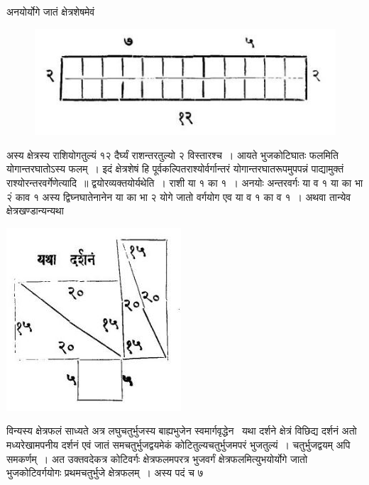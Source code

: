 \documentclass[11pt, openany]{book}
\begin{document}
\noindent अनयोर्योगे जातं क्षेत्रशेषमेवं 

\begin{figure}[h!]
    \centering
    \includegraphics[scale=0.65]{Graphics/Capture7.JPG}
\end{figure}
\vspace{-2mm}

\noindent अस्य क्षेत्रस्य राशियोगतुल्यं १२ दैर्घ्यं राशन्तरतुल्यो २ विस्तारश्च~। 
आयते भुजकोटिघातः फलमिति योगान्तरघातोऽस्य फलम्~। इदं क्षेत्रशेषं हि पूर्वकल्पितराश्योर्वर्गान्तरं योगान्तरघातरूपमुपपन्नं पाद्यामुक्तं 
राश्योरन्तरवर्गेणेत्यादि~॥ द्वयोरव्यक्तयोर्यथेति~। राशी या १ का १~। 
अनयोः अन्तरवर्गः या व १ या का भा २ं काव १ अस्य 
द्विघ्नघातेनानेन या का भा २ योगे जातो वर्गयोग एव या व १ 
का व १~। अथवा तान्येव क्षेत्रखण्डान्यन्यथा 
\vspace{-3mm}

\begin{flushright}
\begin{minipage}[c]{0.3\textwidth}
\includegraphics[scale=0.7]{Graphics/Capture8.JPG}
\end{minipage} 
\hfill
\begin{minipage}{0.55\textwidth} 
\noindent विन्यस्य क्षेत्रफलं साध्यते अत्र लघुचतुर्भुजस्य बाह्यभुजेन \;स्वमार्गवृद्धेन ~यथा \;दर्शने \;क्षेत्रं \;विछिद्य दर्शनं अतो मध्यरेखामपनीय दर्शनं एवं जातं समचतुर्भुजद्वयमेकं कोटितुल्यचतुर्भुजमपरं भुजतुल्यं~। चतुर्भुजद्वयम् अपि समकर्णम्~। अत उक्तवदेकत्र कोटिवर्गः क्षेत्रफलमपरत्र भुजवर्गं क्षेत्रफलमित्युभयोर्योगे जातो भुजकोटिवर्गयोगः प्रथमचतुर्भुजे क्षेत्रफलम्~। अस्य पदं च ७
\end{minipage} 
\end{flushright}
\end{document}
